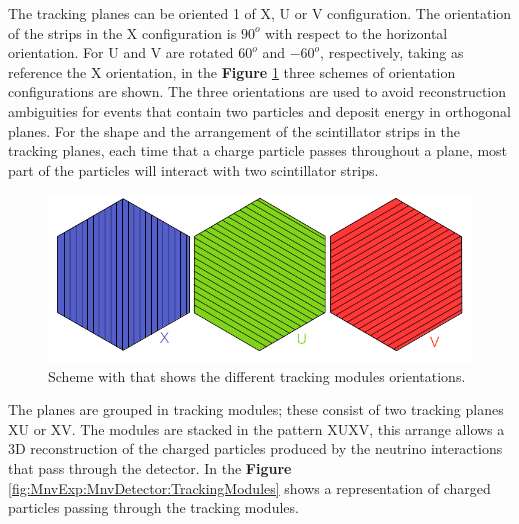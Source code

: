 The tracking planes can be oriented 1 of X, U or V configuration. The orientation of the strips in the X configuration is $90^o$ with respect to the horizontal orientation. For U and V are rotated $60^o$ and $-60^o$, respectively, taking as reference the X orientation, in the \textbf{Figure} \ref{fig:MnvExp:MnvDetector:PlanesOrientations} three schemes of orientation configurations are shown. The three orientations are used to avoid reconstruction ambiguities for events that contain two particles and deposit energy in orthogonal planes. For the shape and the arrangement of the scintillator strips in the tracking planes, each time that a charge particle passes throughout a plane, most part of the particles will interact with two scintillator strips. 

\begin{figure}[!htb]
\centering
\includegraphics[scale=0.4]{Figures/Chapter2/PlanesOrientation.png}

        \caption{Scheme with that shows the different tracking modules orientations.} 
\label{fig:MnvExp:MnvDetector:PlanesOrientations}
\end{figure}

The planes are grouped in tracking modules; these consist of two tracking planes XU or XV. The modules are stacked in the pattern XUXV, this arrange allows a 3D reconstruction of the charged particles produced by the neutrino interactions that pass through the detector. In the \textbf{Figure} \ref{fig:MnvExp:MnvDetector:TrackingModules} shows a representation of charged particles passing through the tracking modules. 

